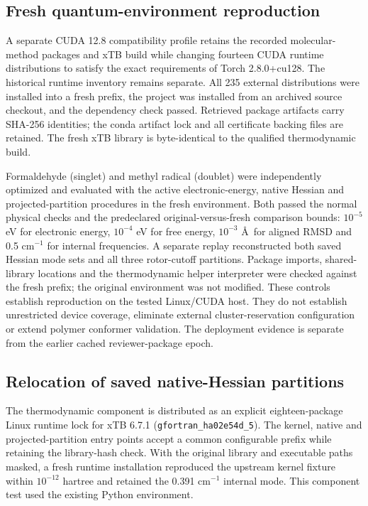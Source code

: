 \documentclass[11pt]{article}
\begin{document}
\subsection{Fresh quantum-environment reproduction}
A separate CUDA 12.8 compatibility profile retains the recorded molecular-method packages and xTB build while changing fourteen CUDA runtime distributions to satisfy the exact requirements of Torch 2.8.0+cu128. The historical runtime inventory remains separate. All 235 external distributions were installed into a fresh prefix, the project was installed from an archived source checkout, and the dependency check passed. Retrieved package artifacts carry SHA-256 identities; the conda artifact lock and all certificate backing files are retained. The fresh xTB library is byte-identical to the qualified thermodynamic build.

Formaldehyde (singlet) and methyl radical (doublet) were independently optimized and evaluated with the active electronic-energy, native Hessian and projected-partition procedures in the fresh environment. Both passed the normal physical checks and the predeclared original-versus-fresh comparison bounds: $10^{-5}$ eV for electronic energy, $10^{-4}$ eV for free energy, $10^{-3}$ \AA\ for aligned RMSD and 0.5 cm$^{-1}$ for internal frequencies. A separate replay reconstructed both saved Hessian mode sets and all three rotor-cutoff partitions. Package imports, shared-library locations and the thermodynamic helper interpreter were checked against the fresh prefix; the original environment was not modified. These controls establish reproduction on the tested Linux/CUDA host. They do not establish unrestricted device coverage, eliminate external cluster-reservation configuration or extend polymer conformer validation. The deployment evidence is separate from the earlier cached reviewer-package epoch.

\subsection{Relocation of saved native-Hessian partitions}
The thermodynamic component is distributed as an explicit eighteen-package Linux runtime lock for xTB 6.7.1 (\texttt{gfortran\_ha02e54d\_5}). The kernel, native and projected-partition entry points accept a common configurable prefix while retaining the library-hash check. With the original library and executable paths masked, a fresh runtime installation reproduced the upstream kernel fixture within $10^{-12}$ hartree and retained the 0.391 cm$^{-1}$ internal mode. This component test used the existing Python environment.
\end{document}

